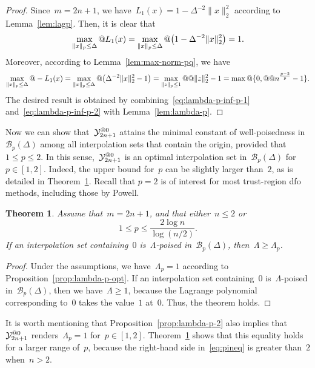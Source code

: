 \documentclass{article}
\makeatletter
\numberwithin{equation}{section}
\theoremstyle{definition}
\theoremstyle{plain}
\newtheorem{theorem}{Theorem}[section]
\theoremstyle{remark}
\newcommand*{\norm}[2][]{#1\lVert#2#1\rVert}
\newcommand*{\set}[2][]{#1\{#2#1\}}
\newcommand*{\lagp}[1][]{L\ifblank{#1}{}{_{#1}}}
\newcommand*{\xpt}[1][]{\mathcal{Y}\ifblank{#1}{}{^{@#1}}}
\makeatother
\begin{document}
\begin{proof}
    Since~$m = 2n + 1$, we have~$L_1(x) = 1 - \Delta^{-2}\norm{x}_2^2$ according to Lemma~\ref{lem:lagp}.
    Then, it is clear that
    \begin{equation}
        \label{eq:lambda-p-inf-p-1}
        \max_{\norm{x}_p \le \Delta} @ \lagp[1](x) = \max_{\norm{x}_p \le \Delta} @ \big( 1 - \Delta^{-2}{\norm{x}_2^2} \big) = 1.
    \end{equation}
    Moreover, according to Lemma~\ref{lem:max-norm-pq}, we have
    \begin{equation}
        \label{eq:lambda-p-inf-p-2}
        \max_{\norm{x}_p \le \Delta} @ -\lagp[1](x) = \max_{\norm{x}_p \le \Delta} @ \big( \Delta^{-2} \norm{x}_2^2 - 1 \big) = \max_{\norm{z}_p \le 1} @@ \norm{z}_2^2 - 1 = \max @ \set{0, @@ n^{\frac{p - 2}{p}} - 1}.
    \end{equation}
    The desired result is obtained by combining~\eqref{eq:lambda-p-inf-p-1} and~\eqref{eq:lambda-p-inf-p-2} with Lemma~\ref{lem:lambda-p}.
\end{proof}

Now we can show that~$\xpt[0]_{2n + 1}$ attains the minimal constant of well-poisedness in~$\mathcal{B}_p(\Delta)$ among all interpolation sets that contain the origin, provided that~$1 \le p \le 2$.
In this sense,~$\xpt[0]_{2n + 1}$ is an optimal interpolation set in~$\mathcal{B}_p(\Delta)$ for~$p \in [1, 2]$.
Indeed, the upper bound for~$p$ can be slightly larger than~$2$, as is detailed in Theorem~\ref{thm:optimset}.
Recall that $p = 2$ is of interest for most trust-region \gls{dfo} methods, including those by Powell.

\begin{theorem}
    \label{thm:optimset}
    Assume that~$m = 2n + 1$, and that either~$n \le 2$ or
    \begin{equation}
        \label{eq:pineq}
        1 \le p \le \frac{2 \log n}{\log (n/2)}.
    \end{equation}
    If an interpolation set containing~$0$ is~$\Lambda$-poised in~$\mathcal{B}_p(\Delta)$, then~$\Lambda \ge \Lambda_p$.
\end{theorem}

\begin{proof}
    Under the assumptions, we have~$\Lambda_p = 1$ according to Proposition~\ref{prop:lambda-p-opt}.
    If an interpolation set containing~$0$ is~$\Lambda$-poised in~$\mathcal{B}_p(\Delta)$, then we
    have~$\Lambda \ge 1$, because the Lagrange polynomial corresponding to~$0$ takes the value~$1$ at~$0$.
    Thus, the theorem holds.
\end{proof}
It is worth mentioning that Proposition~\ref{prop:lambda-p-2} also implies that~$\xpt[0]_{2n + 1}$ renders~$\Lambda_p = 1$ for~$p \in [1, 2]$.
Theorem~\ref{thm:optimset} shows that this equality holds for a larger range of~$p$, because the right-hand side in~\eqref{eq:pineq} is greater than~$2$ when~$n > 2$.
\end{document}
